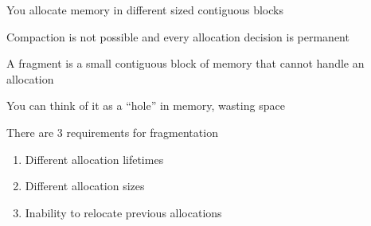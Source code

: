 \begin{slide}


    You allocate memory in different sized contiguous blocks

    \leftspace{}Compaction is not possible and every allocation decision is
    permanent
    \medskip

    A fragment is a small contiguous block of memory that cannot handle an
    allocation

    \leftspace{}You can think of it as a ``hole'' in memory, wasting space
    \medskip

    There are 3 requirements for fragmentation
    \begin{enumerate}
        \item Different allocation lifetimes
        \item Different allocation sizes
        \item Inability to relocate previous allocations  
    \end{enumerate}

\end{slide}

